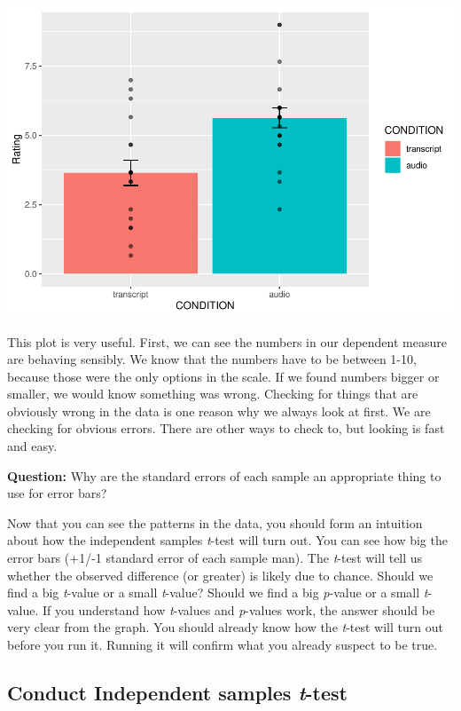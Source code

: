 \documentclass[
]{book}
\begin{document}
\includegraphics{Statistics_Lab_files/figure-latex/unnamed-chunk-223-1.pdf}

This plot is very useful. First, we can see the numbers in our dependent measure are behaving sensibly. We know that the numbers have to be between 1-10, because those were the only options in the scale. If we found numbers bigger or smaller, we would know something was wrong. Checking for things that are obviously wrong in the data is one reason why we always look at first. We are checking for obvious errors. There are other ways to check to, but looking is fast and easy.

\textbf{Question:} Why are the standard errors of each sample an appropriate thing to use for error bars?

Now that you can see the patterns in the data, you should form an intuition about how the independent samples \emph{t}-test will turn out. You can see how big the error bars (+1/-1 standard error of each sample man). The \emph{t}-test will tell us whether the observed difference (or greater) is likely due to chance. Should we find a big \emph{t}-value or a small \emph{t}-value? Should we find a big \emph{p}-value or a small \emph{t}-value. If you understand how \emph{t}-values and \emph{p}-values work, the answer should be very clear from the graph. You should already know how the \emph{t}-test will turn out before you run it. Running it will confirm what you already suspect to be true.

\hypertarget{conduct-independent-samples-t-test}{%
\subsection{\texorpdfstring{Conduct Independent samples \emph{t}-test}{Conduct Independent samples t-test}}\label{conduct-independent-samples-t-test}}
\end{document}
